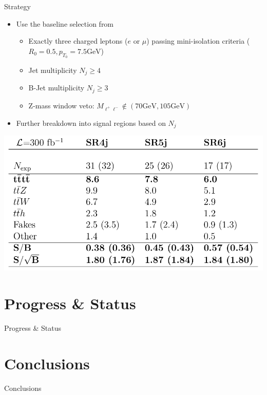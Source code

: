 \documentclass[english,aspectratio=169]{beamer}
\newcommand{\GeV}{\si{\giga\electronvolt}}
\begin{document}
\begin{frame}{Strategy}
  \begin{minipage}[c][\textheight]{0.49\textwidth}
    \small
    \begin{itemize}
      \item Use the baseline selection from\cite{}
      \begin{itemize}
        \item Exactly three charged leptons ($e$ or $\mu$) passing mini-isolation criteria ($R_0=0.5, p_{T_0}=7.5\GeV$)
        \item Jet multiplicity $N_j \ge 4$
        \item B-Jet multiplicity $N_j \ge 3$
        \item Z-mass window veto: $M_{\ell^+\ell^-} \notin (70\GeV,105\GeV)$
      \end{itemize}
      \item Further breakdown into signal regions based on $N_j$
    \end{itemize}
  \end{minipage}
  \begin{minipage}[c][\textheight]{0.49\textwidth}
    \begin{center}
      \includegraphics[width=\textwidth]{figures/event-yields.png}
    \end{center}
  \end{minipage}
\end{frame}


\section{Progress \& Status}
\begin{frame}{Progress \& Status}
\end{frame}

\section{Conclusions}
\begin{frame}{Conclusions}
\end{frame}
\end{document}
